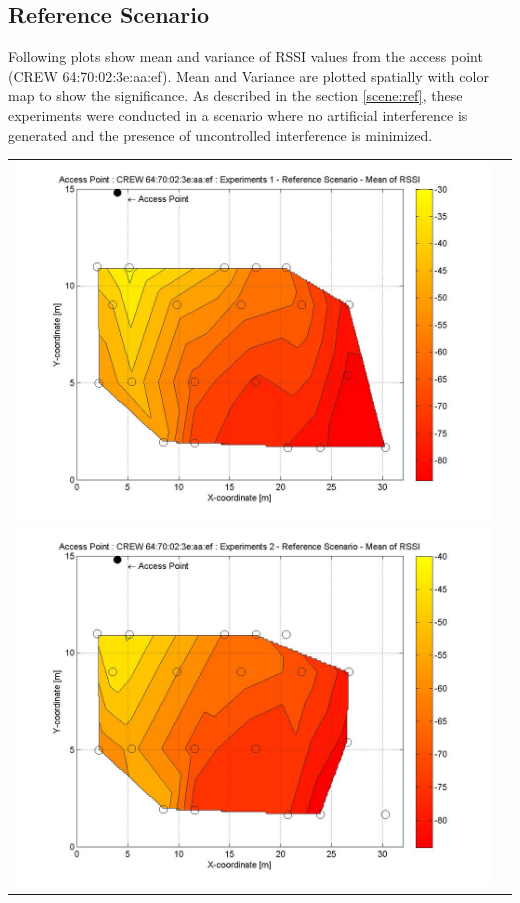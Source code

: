 \documentclass[11pt,a4paper,headinclude,footinclude,chapterprefix=on]{scrreprt}
\begin{document}
\subsection{Reference Scenario} 
Following plots show mean and variance of RSSI values from the access point (CREW 64:70:02:3e:aa:ef). Mean and Variance are plotted spatially with color map to show the significance. As described in the section \ref{scene:ref}, these experiments were conducted in a scenario where no artificial interference is generated and the presence of uncontrolled interference is minimized.
\begin{longtable}
	{lr} 
	\includegraphics[width=13cm]{../../Source/plot/CREW_ef/ef_Ref_Ex_1_Mean.jpg} \\
	\includegraphics[width=13cm]{../../Source/plot/CREW_ef/ef_Ref_Ex_2_Mean.jpg} \\

\end{longtable}
\end{document}
